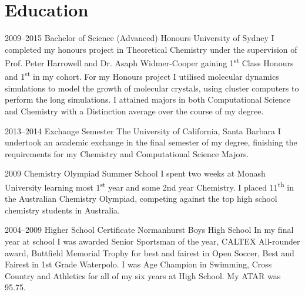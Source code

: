 \documentclass{friggeri-cv} %
\begin{document}

\section{Education}

\begin{entrylist}


\entry
{2009--2015}
{Bachelor of Science (Advanced) Honours}
{University of Sydney}
{I completed my honours project in Theoretical Chemistry under the supervision of Prof. Peter Harrowell and Dr. Asaph Widmer-Cooper gaining 1\textsuperscript{st} Class Honours and 1\textsuperscript{st} in my cohort. For my Honours project I utilised molecular dynamics simulations to model the growth of molecular crystals, using cluster computers to perform the long simulations. I attained majors in both Computational Science and Chemistry with a Distinction average over the course of my degree.
}


\entry
{2013--2014}
{Exchange Semester}
{The University of California, Santa Barbara}
{I undertook an academic exchange in the final semester of my degree, finishing the requirements for my Chemistry and Computational Science Majors.}


\entry
{2009}
{Chemistry Olympiad Summer School}
{}
{I spent two weeks at Monash University learning most 1\textsuperscript{st} year and some 2nd year Chemistry. I placed 11\textsuperscript{th} in the Australian Chemistry Olympiad, competing against the top high school chemistry students in Australia.}

\entry
{2004--2009}
{Higher School Certificate}
{Normanhurst Boys High School}
{In my final year at school I was awarded Senior Sportsman of the year, CALTEX All-rounder award, Buttfield Memorial Trophy for best and fairest in Open Soccer, Best and Fairest in 1st Grade Waterpolo. I was Age Champion in Swimming, Cross Country and Athletics for all of my six years at High School. My ATAR was 95.75.
}


\end{entrylist}
\end{document}
